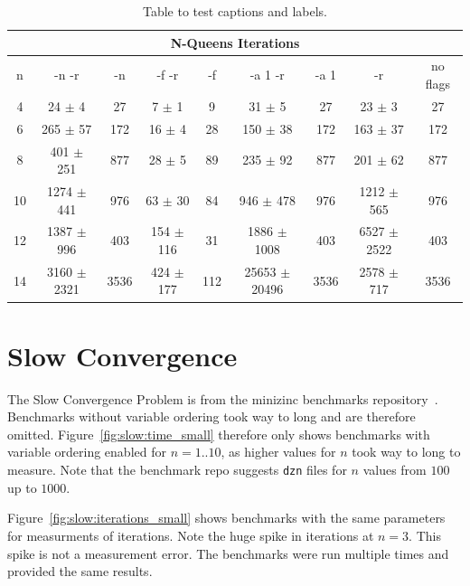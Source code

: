 \begin{table}[h!]
	\centering
	\begin{tabular}{| c | c | c | c | c | c | c | c | c |}
		\hline
		\multicolumn{9}{|c|}{N-Queens Iterations}                                                                 \\ \hline
		n  & -n -r           & -n   & -f -r         & -f  & -a 1 -r           & -a 1 & -r              & no flags \\ \hline
		4  & 24 $\pm$ 4      & 27   & 7 $\pm$ 1     & 9   & 31 $\pm$ 5        & 27   & 23 $\pm$ 3      & 27       \\ \hline
		6  & 265 $\pm$ 57    & 172  & 16 $\pm$ 4    & 28  & 150 $\pm$ 38      & 172  & 163 $\pm$ 37    & 172      \\ \hline
		8  & 401 $\pm$ 251   & 877  & 28 $\pm$ 5    & 89  & 235 $\pm$ 92      & 877  & 201 $\pm$ 62    & 877      \\ \hline
		10 & 1274 $\pm$ 441  & 976  & 63 $\pm$ 30   & 84  & 946 $\pm$ 478     & 976  & 1212 $\pm$ 565  & 976      \\ \hline
		12 & 1387 $\pm$ 996  & 403  & 154 $\pm$ 116 & 31  & 1886 $\pm$ 1008   & 403  & 6527 $\pm$ 2522 & 403      \\ \hline
		14 & 3160 $\pm$ 2321 & 3536 & 424 $\pm$ 177 & 112 & 25653 $\pm$ 20496 & 3536 & 2578 $\pm$ 717  & 3536     \\ \hline
	\end{tabular}
	\caption{Table to test captions and labels.}
	\label{tab:queens:iterations}
\end{table}

\section{Slow Convergence}

The Slow Convergence Problem is from the minizinc benchmarks repository~\cite{minizinc_slow:2018}. Benchmarks without variable ordering took way to long and are therefore omitted. Figure~\ref{fig:slow:time_small} therefore only shows benchmarks with variable ordering enabled for $n=1..10$, as higher values for $n$ took way to long to measure. Note that the benchmark repo suggests \verb|dzn| files for $n$ values from $100$ up to $1000$.

Figure~\ref{fig:slow:iterations_small} shows benchmarks with the same parameters for measurments of iterations. Note the huge spike in iterations at $n = 3$. This spike is not a measurement error. The benchmarks were run multiple times and provided the same results.

